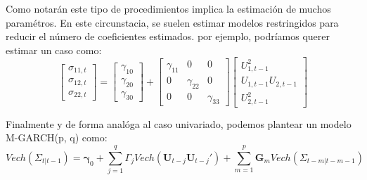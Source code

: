 \documentclass[
]{book}
\begin{document}
Como notarán este tipo de procedimientos implica la estimación de muchos paramétros. En este circunstacia, se suelen estimar modelos restringidos para reducir el número de coeficientes estimados. por ejemplo, podríamos querer estimar un caso como:
\begin{equation*}
    \begin{bmatrix}
    \sigma_{11, t} \\ \sigma_{12, t} \\ \sigma_{22, t}
    \end{bmatrix} =
    \begin{bmatrix}
    \gamma_{10} \\ \gamma_{20} \\ \gamma_{30}
    \end{bmatrix} +
    \begin{bmatrix}
    \gamma_{11} & 0 & 0 \\ 0 & \gamma_{22} & 0 \\ 0 & 0 & \gamma_{33}
    \end{bmatrix} 
    \begin{bmatrix}
    U^2_{1, t-1} \\ U_{1, t-1} U_{2, t-1} \\ U^2_{2, t-1}
    \end{bmatrix}
\end{equation*}

Finalmente y de forma analóga al caso univariado, podemos plantear un modelo M-GARCH(p, q) como:
\begin{equation}
    Vech(\Sigma_{t | t-1}) = \boldsymbol{\gamma}_0 + \sum_{j = 1}^q \Gamma_j Vech(\mathbf{U}_{t-j} \mathbf{U}_{t-j}') + \sum_{m = 1}^p \mathbf{G}_m Vech(\Sigma_{t-m | t-m-1})
    \label{M_GARCH}
\end{equation}
\end{document}
